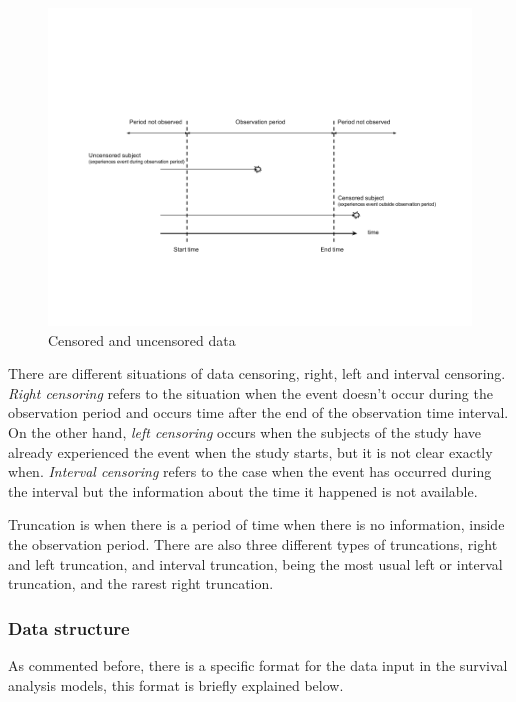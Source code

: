 \documentclass[11pt]{article} %
\begin{document}
      \begin{figure}[!ht]
        \includegraphics[width=\textwidth]{Data_censoring.png}
        \caption{Censored and uncensored data}
        \label{img:data_censoring}
      \end{figure}

      There are different situations of data censoring, right, left and interval censoring. \emph{Right censoring} refers to the situation when the event doesn't occur during the observation period and occurs time after the end of the observation time interval. On the other hand, \emph{left censoring} occurs when the subjects of the study have already experienced the event when the study starts, but it is not clear exactly when. \emph{Interval censoring} refers to the case when the event has occurred during the interval but the information about the time it happened is not available.

      Truncation is when there is a period of time when there is no information, inside the observation period. There are also three different types of truncations, right and left truncation, and interval truncation, being the most usual left or interval truncation, and the rarest right truncation.

    \subsubsection{Data structure}

      As commented before, there is a specific format for the data input in the survival analysis models, this format is briefly explained below.
\end{document}
